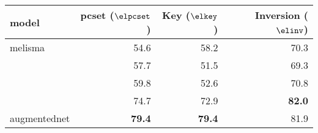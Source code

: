 \begin{tabular}{l|rrr}
model          & \gls{pcset} ($\elpcset$) & Key ($\elkey$) & Inversion ($\elinv$)  \\ \hline
\gls{melisma}        & 54.6 & 58.2 & 70.3 \\
\textcite{mcleod2021modular}     & 57.7 & 51.5 & 69.3 \\
\textcite{chen2021attend}       & 59.8 & 52.6 & 70.8 \\
\textcite{micchi2021deep}     & 74.7 & 72.9 & \textbf{82.0} \\
\gls{augmentednet} & \textbf{79.4} & \textbf{79.4} & 81.9
\end{tabular}
